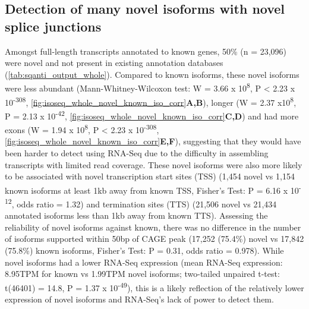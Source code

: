 \subsection{Detection of many novel isoforms with novel splice junctions}
\label{sec:whole_novelIso}
Amongst full-length transcripts annotated to known genes, 50\% (n = 23,096) were novel and not present in existing annotation databases (\cref{tab:sqanti_output_whole}). Compared to known isoforms, these novel isoforms were less abundant (Mann-Whitney-Wilcoxon test: W = 3.66 x 10\textsuperscript{8}, P < 2.23 x 10\textsuperscript{-308}, \cref{fig:isoseq_whole_novel_known_iso_corr}\textbf{A,B}), longer (W = 2.37 x10\textsuperscript{8}, P = 2.13 x 10\textsuperscript{-42}, \cref{fig:isoseq_whole_novel_known_iso_corr}\textbf{C,D}) and had more exons (W = 1.94 x 10\textsuperscript{8}, P < 2.23 x 10\textsuperscript{-308}, \cref{fig:isoseq_whole_novel_known_iso_corr}\textbf{E,F}), suggesting that they would have been harder to detect using RNA-Seq due to the difficulty in assembling transcripts with limited read coverage. These novel isoforms were also more likely to be associated with novel transcription start sites (TSS) (1,454 novel vs 1,154 known isoforms at least 1kb away from known TSS, Fisher's Test: P = 6.16 x 10\textsuperscript{-12}, odds ratio = 1.32) and termination sites (TTS) (21,506 novel vs 21,434 annotated isoforms less than 1kb away from known TTS). Assessing the reliability of novel isoforms against known, there was no difference in the number of isoforms supported within 50bp of CAGE peak (17,252 (75.4\%) novel vs 17,842 (75.8\%) known isoforms, Fisher's Test: P = 0.31, odds ratio = 0.978). While novel isoforms had a lower RNA-Seq expression (mean RNA-Seq expression: 8.95TPM for known vs 1.99TPM novel isoforms; two-tailed unpaired t-test: t(46401) = 14.8, P = 1.37 x 10\textsuperscript{-49}), this is a likely reflection of the relatively lower expression of novel isoforms and RNA-Seq's lack of power to detect them.



